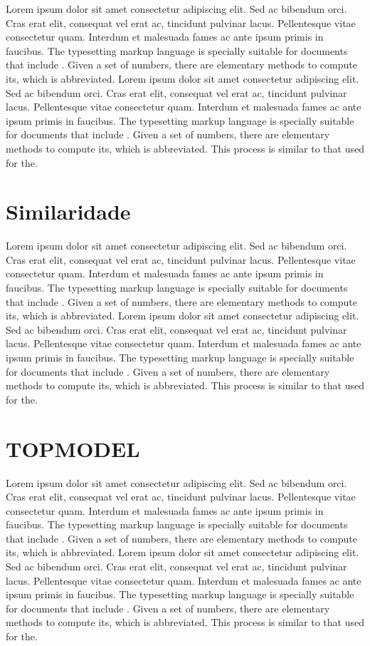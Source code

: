 \documentclass[./main.tex]{subfiles}
\begin{document}
\par Lorem ipsum dolor sit amet consectetur adipiscing elit. Sed ac bibendum orci. Cras erat elit, consequat vel erat ac, tincidunt pulvinar lacus. Pellentesque vitae consectetur quam. Interdum et malesuada fames ac ante ipsum primis in faucibus. The typesetting markup language is specially suitable for documents that include . Given a set of numbers, there are elementary methods to compute its, which is abbreviated. Lorem ipsum dolor sit amet consectetur adipiscing elit. Sed ac bibendum orci. Cras erat elit, consequat vel erat ac, tincidunt pulvinar lacus. Pellentesque vitae consectetur quam. Interdum et malesuada fames ac ante ipsum primis in faucibus. The typesetting markup language is specially suitable for documents that include . Given a set of numbers, there are elementary methods to compute its, which is abbreviated. This process is similar to that used for the. 

\section{Similaridade} \label{sec:hydro:sim}

\par Lorem ipsum dolor sit amet consectetur adipiscing elit. Sed ac bibendum orci. Cras erat elit, consequat vel erat ac, tincidunt pulvinar lacus. Pellentesque vitae consectetur quam. Interdum et malesuada fames ac ante ipsum primis in faucibus. The typesetting markup language is specially suitable for documents that include . Given a set of numbers, there are elementary methods to compute its, which is abbreviated. Lorem ipsum dolor sit amet consectetur adipiscing elit. Sed ac bibendum orci. Cras erat elit, consequat vel erat ac, tincidunt pulvinar lacus. Pellentesque vitae consectetur quam. Interdum et malesuada fames ac ante ipsum primis in faucibus. The typesetting markup language is specially suitable for documents that include . Given a set of numbers, there are elementary methods to compute its, which is abbreviated. This process is similar to that used for the. 

\section{TOPMODEL} \label{sec:hydro:topmodel}

\par Lorem ipsum dolor sit amet consectetur adipiscing elit. Sed ac bibendum orci. Cras erat elit, consequat vel erat ac, tincidunt pulvinar lacus. Pellentesque vitae consectetur quam. Interdum et malesuada fames ac ante ipsum primis in faucibus. The typesetting markup language is specially suitable for documents that include . Given a set of numbers, there are elementary methods to compute its, which is abbreviated. Lorem ipsum dolor sit amet consectetur adipiscing elit. Sed ac bibendum orci. Cras erat elit, consequat vel erat ac, tincidunt pulvinar lacus. Pellentesque vitae consectetur quam. Interdum et malesuada fames ac ante ipsum primis in faucibus. The typesetting markup language is specially suitable for documents that include . Given a set of numbers, there are elementary methods to compute its, which is abbreviated. This process is similar to that used for the. 
\end{document}
